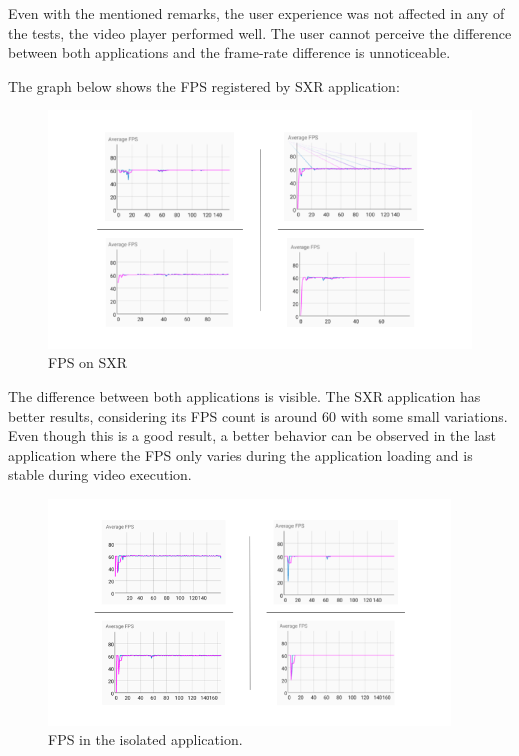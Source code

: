 \documentclass[runningheads]{llncs}
\begin{document}
Even with the mentioned remarks, the user experience was not affected in any of the tests, the video player performed well. The user cannot perceive the difference between both applications and the frame-rate difference is unnoticeable.

The graph below shows the FPS registered by SXR application:

\begin{figure}[h]
    \centering
    \includegraphics[width=\textwidth]{images/SXR.png}
    \caption{FPS on SXR}
    \label{SXR-graph}
\end{figure}

The difference between both applications is visible. The SXR application has better results, considering its FPS count is around 60 with some small variations. Even though this is a good result, a better behavior can be observed in the last application where the FPS only varies during the application loading and is stable during video execution.

\begin{figure}
    \centering
    \includegraphics[width=\textwidth, height=6cm]{images/SeparetedApp.png}
    \caption{FPS in the isolated application.}
    \label{app-graph}
\end{figure}
\end{document}
